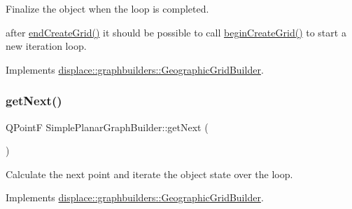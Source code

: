 Finalize the object when the loop is completed. 

after \mbox{\hyperlink{classdisplace_1_1graphbuilders_1_1_simple_planar_graph_builder_a829ff92a1bd9dba3170a49ed42b193cc}{end\+Create\+Grid()}} it should be possible to call \mbox{\hyperlink{classdisplace_1_1graphbuilders_1_1_simple_planar_graph_builder_acc34e4093c7e96d705b7269bebf20233}{begin\+Create\+Grid()}} to start a new iteration loop. 

Implements \mbox{\hyperlink{classdisplace_1_1graphbuilders_1_1_geographic_grid_builder_ac5f018a1c87a2e1274ff620ee7b374a6}{displace\+::graphbuilders\+::\+Geographic\+Grid\+Builder}}.

\mbox{\label{classdisplace_1_1graphbuilders_1_1_simple_planar_graph_builder_a58f7a91f6889c37b462abaaf0844c49b}} 
\subsubsection{\texorpdfstring{getNext()}{getNext()}}
{\footnotesize\ttfamily Q\+PointF Simple\+Planar\+Graph\+Builder\+::get\+Next (\begin{DoxyParamCaption}{ }\end{DoxyParamCaption})\hspace{0.3cm}{\ttfamily [virtual]}}



Calculate the next point and iterate the object state over the loop. 



Implements \mbox{\hyperlink{classdisplace_1_1graphbuilders_1_1_geographic_grid_builder_a4b896b8f9e562644829df273302674b0}{displace\+::graphbuilders\+::\+Geographic\+Grid\+Builder}}.

\mbox{\label{classdisplace_1_1graphbuilders_1_1_simple_planar_graph_builder_ad5a6e8911d9599a5331facc31c5caa11}} 
